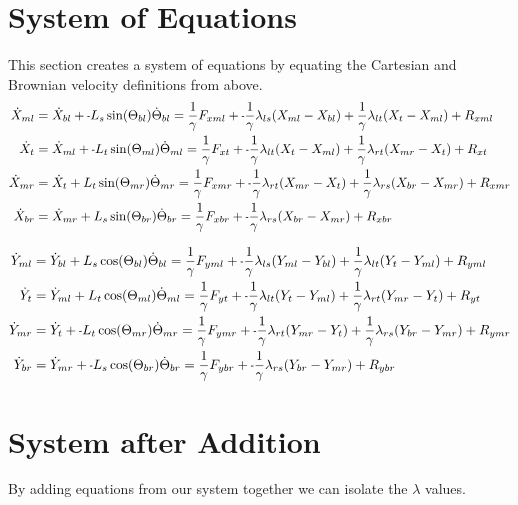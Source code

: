 \documentclass[11pt, landscape]{article}
\newcommand{\mn}{\scalebox{0.7}[1.0]{-}}
\begin{document}
\section{System of Equations}
This section creates a system of equations by equating the Cartesian and Brownian velocity definitions from above. \\

\begin{align}  
  \dot{X}_{ml} &= \dot{X}_{bl} + \mn L_{s}\sin(\Theta_{bl})\dot{\Theta}_{bl} = \frac{1}{\gamma}F_{xml} + \mn\frac{1}{\gamma}\lambda_{ls}(X_{ml} - X_{bl}) + \frac{1}{\gamma}\lambda_{lt}(X_{t } - X_{ml}) + R_{xml} \\
  \dot{X}_{t}  &= \dot{X}_{ml} + \mn L_{t}\sin(\Theta_{ml})\dot{\Theta}_{ml} = \frac{1}{\gamma}F_{xt } + \mn\frac{1}{\gamma}\lambda_{lt}(X_{t } - X_{ml}) + \frac{1}{\gamma}\lambda_{rt}(X_{mr} - X_{t }) + R_{xt } \\
  \dot{X}_{mr} &= \dot{X}_{t } + L_{t}\sin(\Theta_{mr})\dot{\Theta}_{mr} = \frac{1}{\gamma}F_{xmr} + \mn\frac{1}{\gamma}\lambda_{rt}(X_{mr} - X_{t }) + \frac{1}{\gamma}\lambda_{rs}(X_{br} - X_{mr}) + R_{xmr} \\
  \dot{X}_{br} &= \dot{X}_{mr} + L_{s}\sin(\Theta_{br})\dot{\Theta}_{br} = \frac{1}{\gamma}F_{xbr} + \mn\frac{1}{\gamma}\lambda_{rs}(X_{br} - X_{mr}) + R_{xbr}
\end{align}

\begin{align}  
  \dot{Y}_{ml} &= \dot{Y}_{bl} + L_{s}\cos(\Theta_{bl})\dot{\Theta}_{bl} = \frac{1}{\gamma}F_{yml} + \mn\frac{1}{\gamma}\lambda_{ls}(Y_{ml} - Y_{bl}) + \frac{1}{\gamma}\lambda_{lt}(Y_{t } - Y_{ml}) + R_{yml} \\
  \dot{Y}_{t}  &= \dot{Y}_{ml} + L_{t}\cos(\Theta_{ml})\dot{\Theta}_{ml} = \frac{1}{\gamma}F_{yt } + \mn\frac{1}{\gamma}\lambda_{lt}(Y_{t } - Y_{ml}) + \frac{1}{\gamma}\lambda_{rt}(Y_{mr} - Y_{t }) + R_{yt } \\
  \dot{Y}_{mr} &= \dot{Y}_{t } + \mn L_{t}\cos(\Theta_{mr})\dot{\Theta}_{mr} = \frac{1}{\gamma}F_{ymr} + \mn\frac{1}{\gamma}\lambda_{rt}(Y_{mr} - Y_{t }) + \frac{1}{\gamma}\lambda_{rs}(Y_{br} - Y_{mr}) + R_{ymr} \\
  \dot{Y}_{br} &= \dot{Y}_{mr} + \mn L_{s}\cos(\Theta_{br})\dot{\Theta}_{br} = \frac{1}{\gamma}F_{ybr} + \mn\frac{1}{\gamma}\lambda_{rs}(Y_{br} - Y_{mr}) + R_{ybr}
\end{align}

\section{System after Addition}
By adding equations from our system together we can isolate the $\lambda$ values. \\
\end{document}
